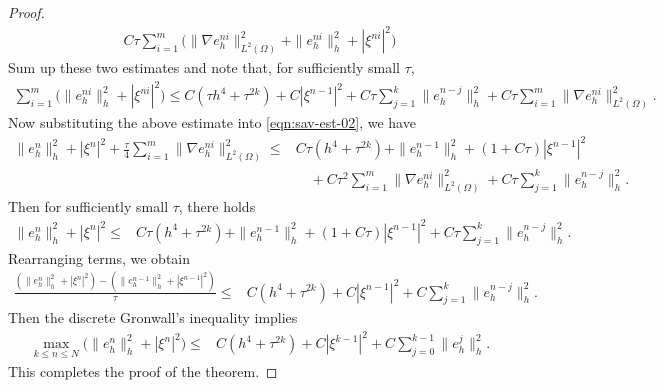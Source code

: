 \documentclass[10pt,final,leqno,onefignum,onetabnum]{siamltex}%
\def\II{(\Omega)}
\begin{document}
\begin{proof}
\begin{equation*}
\begin{split}
 C\tau \sum_{i=1}^m \Big(\| \nabla e_h^{ni}  \|_{L^2\II}^2 + \|  e_h^{ni}  \|_{h}^2 + |\xi^{ni}|^2 \Big)
\end{split}
\end{equation*}
Sum up these two estimates and note that,
for sufficiently small $\tau$,
\begin{equation*}
\begin{split}
 \sum_{i=1}^m \Big(\|e_h^{ni}\|_h^2+ |\xi^{ni}|^2\Big)  \le C(\tau h^4 + \tau^{2k})+C|\xi^{n-1}|^2
 + C\tau \sum_{j=1}^k \| e_h^{n-j} \|_h^2 +
 C\tau \sum_{i=1}^m \| \nabla e_h^{ni}  \|_{L^2\II}^2.
\end{split}
\end{equation*}
Now substituting the above estimate into \eqref{eqn:sav-est-02}, we have
\begin{equation*}%
\begin{split}
 \|e_h^{n}\|_h^2 + |\xi^n|^2 + \frac\tau4 \sum_{i=1}^m \| \nabla e_h^{ni} \|_{L^2\II}^2
 \le&  C\tau(h^4+ \tau^{2k}) +  \|e_h^{n-1}\|_h^2 + (1+C \tau) |\xi^{n-1}|^2   \\
&\quad + C\tau^2 \sum_{i=1}^m \| \nabla e_h^{ni}  \|_{L^2\II}^2
+ C\tau  \sum_{j=1}^{k} \|  e_h^{n-j} \|_h^2.
\end{split}
\end{equation*}
Then for sufficiently small $\tau$, there holds
\begin{equation*}
\begin{split}
 \|e_h^{n}\|_h^2 + |\xi^n|^2
 \le&  C\tau(h^4+ \tau^{2k}) +  \|e_h^{n-1}\|_h^2 + (1+C \tau) |\xi^{n-1}|^2   + C\tau  \sum_{j=1}^{k} \|  e_h^{n-j} \|_h^2.
\end{split}
\end{equation*}
Rearranging terms, we obtain
\begin{equation*}
\begin{split}
 \frac{(\|e_h^{n}\|_h^2 + |\xi^n|^2) - (\|e_h^{n-1}\|_h^2 + |\xi^{n-1}|^2)}{\tau}
 \le&  C (h^4+ \tau^{2k})  + C |\xi^{n-1}|^2   + C \sum_{j=1}^{k} \|  e_h^{n-j} \|_h^2.
\end{split}
\end{equation*}
Then the discrete Gronwall's inequality implies
\begin{equation*}
\begin{split}
\max_{k \le n\le N} \Big(\|e_h^{n}\|_h^2 + |\xi^n|^2\Big)
 \le&  C (h^4+ \tau^{2k})  + C |\xi^{k-1}|^2    + C \sum_{j=0}^{k-1} \|  e_h^{j} \|_h^2.
\end{split}
\end{equation*}
This completes the proof of the theorem.
\end{proof}
\end{document}
